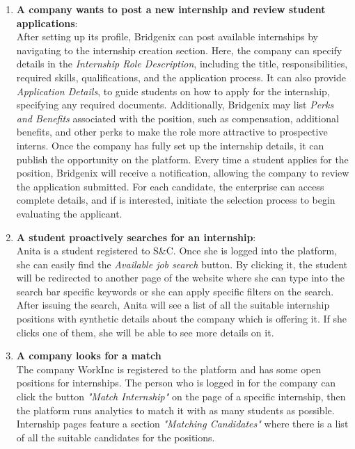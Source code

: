 \begin{enumerate}
            \item \textbf{A company wants to post a new internship and review student applications}:
            \\After setting up its profile, Bridgenix can post available internships by navigating to the internship creation section. Here, the company can specify details in the \textit{Internship Role Description}, including the title, responsibilities, required skills, qualifications, and the application process.
            It can also provide \textit{Application Details}, to guide students on how to apply for the internship, specifying any required documents. Additionally, Bridgenix may list \textit{Perks and Benefits} associated with the position, such as compensation, additional benefits, and other perks to make the role more attractive to prospective interns. Once the company has fully set up the internship details, it can publish the opportunity on the platform. 
            Every time a student applies for the position, Bridgenix will receive a notification, allowing the company to review the application submitted. For each candidate, the enterprise can access complete details, and if is interested, initiate the selection process to begin evaluating the applicant.
            
            \item \textbf{A student proactively searches for an internship}:  
            \\Anita is a student registered to S\&C. Once she is logged into the platform, she can easily find the \textit{Available job search} button. By clicking it, the student will be redirected to another page of the website where she can type into the search bar specific keywords or she can apply specific filters on the search. After issuing the search, Anita will see a list of all the suitable internship positions with synthetic details about the company which is offering it. If she clicks one of them, she will be able to see more details on it.
            
            \item \textbf{A company looks for a match}   
            \\The company WorkInc is registered to the platform and has some open positions for internships. The person who is logged in for the company can click the button \textit{"Match Internship"} on the page of a specific internship, then the platform runs analytics to match it with as many students as possible. Internship pages feature a section \textit{"Matching Candidates"} where there is a list of all the suitable candidates for the positions. 


\end{enumerate}
